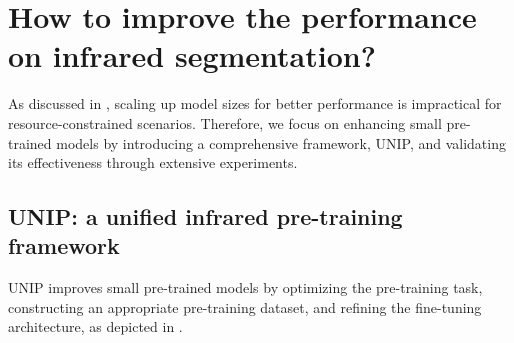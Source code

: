 \section{How to improve the performance on infrared segmentation?}
\label{sec:distill}
As discussed in , scaling up model sizes for better performance is impractical for resource-constrained scenarios. Therefore, we focus on enhancing small pre-trained models by introducing a comprehensive framework, UNIP, and validating its effectiveness through extensive experiments.

\subsection{UNIP: a unified infrared pre-training framework}
\label{sec:unip}
UNIP improves small pre-trained models by optimizing the pre-training task, constructing an appropriate pre-training dataset, and refining the fine-tuning architecture, as depicted in .

